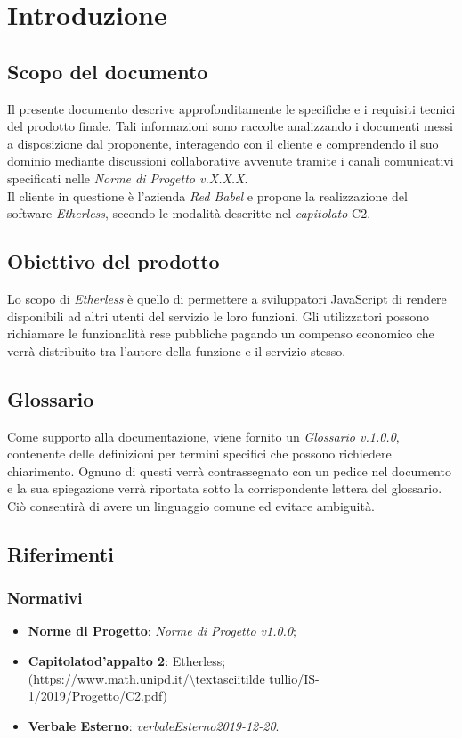 \section{Introduzione}

\subsection{Scopo del documento}
Il presente documento descrive approfonditamente le specifiche e i requisiti tecnici del prodotto finale. Tali informazioni sono raccolte analizzando i documenti messi a disposizione dal proponente, interagendo con il cliente e comprendendo il suo dominio mediante discussioni collaborative avvenute tramite i canali comunicativi specificati nelle \textit{Norme di Progetto v.X.X.X}.\\
Il cliente in questione è l'azienda \textit{Red Babel} e propone la realizzazione del software \textit{Etherless}, secondo le modalità descritte nel \textit{capitolato\glo} C2.

\subsection{Obiettivo del prodotto}
Lo scopo di \textit{Etherless} è quello di permettere a sviluppatori JavaScript di rendere disponibili ad altri utenti del servizio le loro funzioni. Gli utilizzatori possono richiamare le funzionalità rese pubbliche pagando un compenso economico che verrà distribuito tra l'autore della funzione e il servizio stesso.
	
\subsection{Glossario}
Come supporto alla documentazione, viene fornito un \textit{Glossario v.1.0.0}, contenente delle definizioni per termini specifici che possono richiedere chiarimento. Ognuno di questi verrà contrassegnato con un pedice \glo nel documento e la sua spiegazione verrà riportata sotto la corrispondente lettera del glossario. Ciò consentirà di avere un linguaggio comune ed evitare ambiguità. 
	
\subsection{Riferimenti}
\subsubsection{Normativi}
	\begin{itemize}
		\item \textbf{Norme di Progetto}: \textit{Norme di Progetto v1.0.0};
		\item \textbf{Capitolato\glo d'appalto 2}: Etherless;\\ 
			(\url{https://www.math.unipd.it/\textasciitilde tullio/IS-1/2019/Progetto/C2.pdf})
		\item \textbf{Verbale Esterno}: \textit{verbaleEsterno2019-12-20}.
	\end{itemize}
